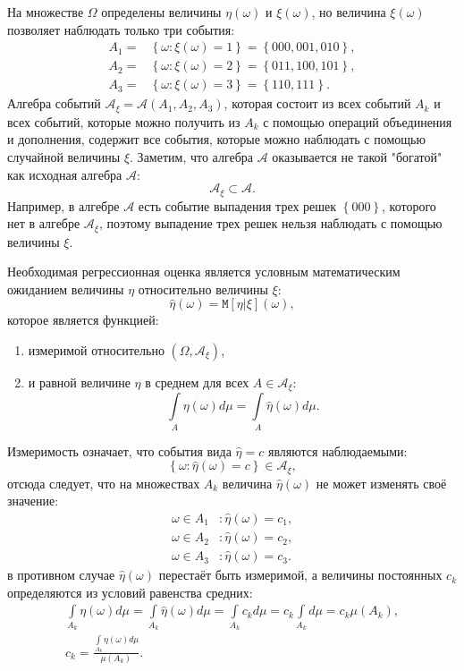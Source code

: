 \documentclass[a4paper,12pt]{article}
\newcommand{\cexpectation}[2]{\texttt{M} \left[ #1 | #2 \right]}
\newcommand{\set}[1]{\left \{ #1 \right \}}
\begin{document}
На множестве $\Omega$ определены величины $\eta(\omega)$ и $\xi(\omega)$, но величина $\xi(\omega)$ позволяет наблюдать только три события:
\begin{align*}
    A_1 = & \set{\omega: \xi(\omega) = 1} = \set{000, 001, 010} , \\
    A_2 = & \set{\omega: \xi(\omega) = 2} = \set{011, 100, 101} , \\
    A_3 = & \set{\omega: \xi(\omega) = 3} = \set{110, 111} .
\end{align*}
Алгебра событий $\mathcal{A}_\xi = \mathcal{A}(A_1, A_2, A_3)$, которая состоит из всех событий $A_k$ и всех событий, которые можно получить из
$A_k$ с помощью операций объединения и дополнения, содержит все события, которые можно наблюдать с помощью случайной величины $\xi$. Заметим, что
алгебра $\mathcal{A}$ оказывается не такой "богатой"{} как исходная алгебра $\mathcal{A}$:
\[
    \mathcal{A}_\xi \subset \mathcal{A}.
\]
Например, в алгебре $\mathcal{A}$ есть событие выпадения трех решек $\set{000}$, которого нет в алгебре $\mathcal{A}_\xi$, поэтому выпадение трех решек
нельзя наблюдать с помощью величины $\xi$.

Необходимая регрессионная оценка является условным математическим ожиданием величины $\eta$ относительно величины $\xi$:
\[
    \widehat{\eta}(\omega) = \cexpectation{\eta}{\xi}(\omega) ,
\]
которое является функцией:
\begin{enumerate}
    \item измеримой относительно $(\Omega, \mathcal{A}_\xi)$,
    \item и равной величине $\eta$ в среднем для всех $A \in \mathcal{A}_\xi$:
          \[
              \int \limits_{A} \eta(\omega) d \mu = \int \limits_{A} \widehat{\eta}(\omega) d \mu .
          \]
\end{enumerate}
Измеримость означает, что события вида $\widehat{\eta} = c$ являются наблюдаемыми:
\[
    \set{\omega: \widehat{\eta}(\omega) = c} \in \mathcal{A}_\xi ,
\]
отсюда следует, что на множествах $A_k$ величина $\widehat{\eta}(\omega)$ не может изменять своё значение:
\begin{align*}
    \omega \in A_1 & : \widehat{\eta}(\omega) = c_1 , \\
    \omega \in A_2 & : \widehat{\eta}(\omega) = c_2 , \\
    \omega \in A_3 & : \widehat{\eta}(\omega) = c_3 .
\end{align*}
в противном случае $\widehat{\eta}(\omega)$ перестаёт быть измеримой, а величины постоянных $c_k$ определяются из условий равенства средних:
\begin{gather*}
    \int \limits_{A_k} \eta(\omega) d \mu
    = \int \limits_{A_k} \widehat{\eta}(\omega) d \mu
    = \int \limits_{A_k} c_k d \mu
    = c_k \int \limits_{A_k} d \mu
    = c_k \mu(A_k) , \\
    c_k = \frac{\int \limits_{A_k} \eta(\omega) d \mu}{\mu(A_k)} .
\end{gather*}
\end{document}

